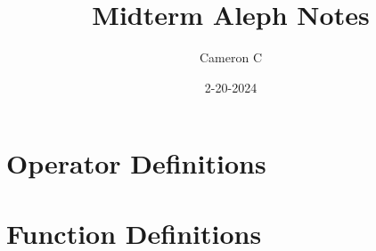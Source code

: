 \documentclass[12pt, letterpaper, fleqn]{article}
\title{Midterm Aleph Notes}
\author{Cameron C}
\date{2-20-2024}
\begin{document}
\maketitle

\section{Operator Definitions}

\section{Function Definitions}

\section{}
\end{document}
